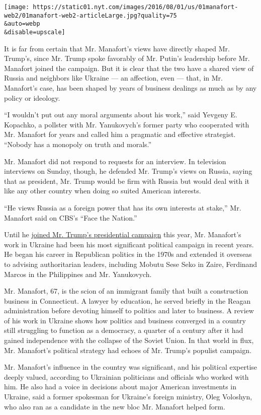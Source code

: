 \texttt{[image: https://static01.nyt.com/images/2016/08/01/us/01manafort-web2/01manafort-web2-articleLarge.jpg?quality=75\\\&auto=webp\\\&disable=upscale]}

It is far from certain that Mr. Manafort's views have directly shaped
Mr. Trump's, since Mr. Trump spoke favorably of Mr. Putin's leadership
before Mr. Manafort joined the campaign. But it is clear that the two
have a shared view of Russia and neighbors like Ukraine --- an
affection, even --- that, in Mr. Manafort's case, has been shaped by
years of business dealings as much as by any policy or ideology.

``I wouldn't put out any moral arguments about his work,'' said Yevgeny
E. Kopachko, a pollster with Mr. Yanukovych's former party who
cooperated with Mr. Manafort for years and called him a pragmatic and
effective strategist. ``Nobody has a monopoly on truth and morals.''

Mr. Manafort did not respond to requests for an interview. In television
interviews on Sunday, though, he defended Mr. Trump's views on Russia,
saying that as president, Mr. Trump would be firm with Russia but would
deal with it like any other country when doing so suited American
interests.

``He views Russia as a foreign power that has its own interests at
stake,'' Mr. Manafort said on CBS's ``Face the Nation.''

Until he
\href{https://www.nytimes.com/politics/first-draft/2016/03/28/donald-trump-hires-paul-manafort-to-lead-delegate-effort/?_r=0}{joined
Mr. Trump's presidential campaign} this year, Mr. Manafort's work in
Ukraine had been his most significant political campaign in recent
years. He began his career in Republican politics in the 1970s and
extended it overseas to advising authoritarian leaders, including Mobutu
Sese Seko in Zaire, Ferdinand Marcos in the Philippines and Mr.
Yanukovych.

Mr. Manafort, 67, is the scion of an immigrant family that built a
construction business in Connecticut. A lawyer by education, he served
briefly in the Reagan administration before devoting himself to politics
and later to business. A review of his work in Ukraine shows how
politics and business converged in a country still struggling to
function as a democracy, a quarter of a century after it had gained
independence with the collapse of the Soviet Union. In that world in
flux, Mr. Manafort's political strategy had echoes of Mr. Trump's
populist campaign.

Mr. Manafort's influence in the country was significant, and his
political expertise deeply valued, according to Ukrainian politicians
and officials who worked with him. He also had a voice in decisions
about major American investments in Ukraine, said a former spokesman for
Ukraine's foreign ministry, Oleg Voloshyn, who also ran as a candidate
in the new bloc Mr. Manafort helped form.

